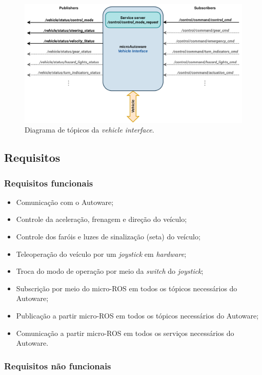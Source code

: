 	\begin{figure}[H]
	\centering
	\includegraphics[width=0.75\linewidth]{img/vehicle_interface-topics}
	\caption{Diagrama de tópicos da \textit{vehicle interface}.}
	\label{fig:vehicleinterface-topics}
\end{figure}

\subsection{Requisitos}

\subsubsection*{Requisitos funcionais}
	
	\begin{itemize}
		\item Comunicação com o Autoware;
		\item Controle da aceleração, frenagem e direção do veículo;
		\item Controle dos faróis e luzes de sinalização (seta) do veículo;
		\item Teleoperação do veículo por um \textit{joystick} em  \textit{hardware};
		\item Troca do modo de operação por meio da \textit{switch} do \textit{joystick};
		\item Subscrição por meio do micro-ROS em todos os tópicos necessários do Autoware;
		\item Publicação a partir micro-ROS em todos os tópicos necessários do Autoware;
		\item Comunicação a partir micro-ROS em todos os serviços necessários do Autoware.
		
	\end{itemize}

\subsubsection*{Requisitos não funcionais}
	
